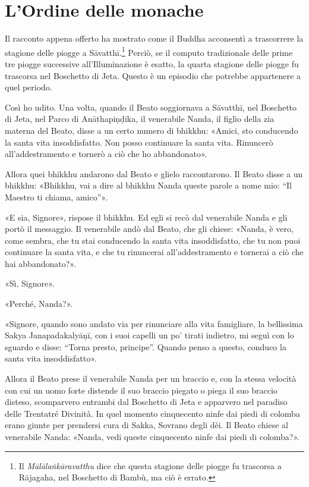 \chapter{L'Ordine delle monache}

 Il racconto appena offerto ha mostrato come il
Buddha acconsentì a trascorrere la stagione delle piogge a Sāvatthī.\footnote{Il
  \emph{Mālālaṅkāravatthu} dice che questa stagione delle piogge fu trascorsa a
  Rājagaha, nel Boschetto di Bambù, ma ciò è errato.} Perciò, se il computo
tradizionale delle prime tre piogge successive all’Illuminazione è esatto, la
quarta stagione delle piogge fu trascorsa nel Boschetto di Jeta. Questo è un
episodio che potrebbe appartenere a quel periodo.

 Così ho udito. Una volta, quando il Beato soggiornava a
Sāvatthī, nel Boschetto di Jeta, nel Parco di Anāthapiṇḍika, il venerabile
Nanda, il figlio della zia materna del Beato, disse a un certo numero di
bhikkhu: «Amici, sto conducendo la santa vita insoddisfatto. Non posso
continuare la santa vita. Rinuncerò all’addestramento e tornerò a ciò che ho
abbandonato».

Allora quei bhikkhu andarono dal Beato e glielo raccontarono. Il Beato disse a
un bhikkhu: «Bhikkhu, vai a dire al bhikkhu Nanda queste parole a nome mio: “Il
Maestro ti chiama, amico”».

«E sia, Signore», rispose il bhikkhu. Ed egli si recò dal venerabile Nanda e gli
portò il messaggio. Il venerabile andò dal Beato, che gli chiese: «Nanda, è
vero, come sembra, che tu stai conducendo la santa vita insoddisfatto, che tu
non puoi continuare la santa vita, e che tu rinuncerai all’addestramento e
tornerai a ciò che hai abbandonato?».

«Sì, Signore».

«Perché, Nanda?».

«Signore, quando sono andato via per rinunciare alla vita famigliare, la
bellissima Sakya Janapadakalyāṇī, con i suoi capelli un po’ tirati indietro, mi
seguì con lo sguardo e disse: “Torna presto, principe”. Quando penso a questo,
conduco la santa vita insoddisfatto».

Allora il Beato prese il venerabile Nanda per un braccio e, con la stessa
velocità con cui un uomo forte distende il suo braccio piegato o piega il suo
braccio disteso, scomparvero entrambi dal Boschetto di Jeta e apparvero nel
paradiso delle Trentatré Divinità. In quel momento cinquecento ninfe dai piedi
di colomba erano giunte per prendersi cura di Sakka, Sovrano degli dèi. Il Beato
chiese al venerabile Nanda: «Nanda, vedi queste cinquecento ninfe dai piedi di
colomba?».

